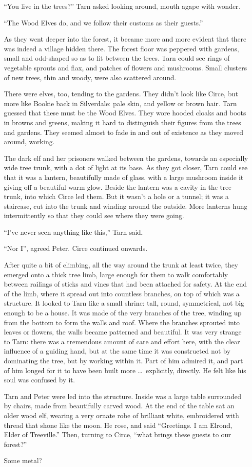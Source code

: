 ``You live in the trees?'' Tarn asked looking around, mouth agape with wonder.

``The Wood Elves do, and we follow their customs as their guests.''

As they went deeper into the forest, it became more and more evident that there was indeed a village hidden there.  The forest floor was peppered with gardens, small and odd-shaped so as to fit between the trees.  Tarn could see rings of vegetable sprouts and flax, and patches of flowers and mushrooms.  Small clusters of new trees, thin and woody, were also scattered around.

There were elves, too, tending to the gardens.  They didn't look like Circe, but more like Bookie back in Silverdale: pale skin, and yellow or brown hair.  Tarn guessed that these must be the Wood Elves.  They wore hooded cloaks and boots in browns and greens, making it hard to distinguish their figures from the trees and gardens.  They seemed almost to fade in and out of existence as they moved around, working.

The dark elf and her prisoners walked between the gardens, towards an especially wide tree trunk, with a dot of light at its base.  As they got closer, Tarn could see that it was a lantern, beautifully made of glass, with a large mushroom inside it giving off a beautiful warm glow.  Beside the lantern was a cavity in the tree trunk, into which Circe led them.  But it wasn't a hole or a tunnel; it was a staircase, cut into the trunk and winding around the outside.  More lanterns hung intermittently so that they could see where they were going.

``I've never seen anything like this,'' Tarn said.

``Nor I'', agreed Peter.  Circe continued onwards.

After quite a bit of climbing, all the way around the trunk at least twice, they emerged onto a thick tree limb, large enough for them to walk comfortably between railings of sticks and vines that had been attached for safety.  At the end of the limb, where it spread out into countless branches, on top of which was a structure.  It looked to Tarn like a small shrine: tall, round, symmetrical, not big enough to be a house.  It was made of the very branches of the tree, winding up from the bottom to form the walls and roof.  Where the branches sprouted into leaves or flowers, the walls became patterned and beautiful.  It was very strange to Tarn: there was a tremendous amount of care and effort here, with the clear influence of a guiding hand, but at the same time it was constructed not by dominating the tree, but by working within it.  Part of him admired it, and part of him longed for it to have been built more \ldots\ explicitly, directly.  He felt like his soul was confused by it.

Tarn and Peter were led into the structure.  Inside was a large table surrounded by chairs, made from beautifully carved wood.  At the end of the table sat an older wood elf, wearing a very ornate robe of brilliant white, embroidered with thread that shone like the moon.  He rose, and said ``Greetings.  I am Elrond, Elder of Treeville.''  Then, turning to Circe, ``what brings these guests to our forest?''


Some metal?